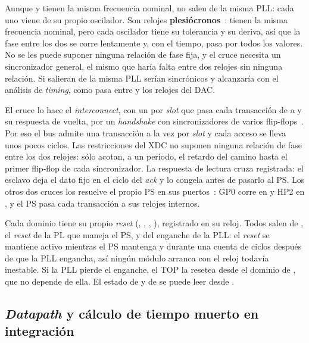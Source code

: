 Aunque  y  tienen la misma frecuencia nominal,
no salen de la misma PLL: cada uno viene de su propio oscilador. Son relojes
\textbf{plesiócronos}~\cite{Dally1998}: tienen la misma frecuencia nominal, pero
cada oscilador tiene su tolerancia y su deriva, así que la fase entre los dos se
corre lentamente y, con el tiempo, pasa por todos los valores. No se les puede
suponer ninguna relación de fase fija, y el cruce necesita un sincronizador
general, el mismo que haría falta entre dos relojes sin ninguna relación. Si
salieran de la misma PLL serían sincrónicos y alcanzaría con el análisis de
\emph{timing}, como pasa entre  y los relojes del DAC.

El cruce lo hace el \emph{interconnect}, con un  por \emph{slot} que pasa
cada transacción de  a  y su respuesta de
vuelta, por un \emph{handshake} con sincronizadores de varios
flip-flops~\cite{Cummings2008}. Por eso el bus admite una transacción a la vez
por \emph{slot} y cada acceso se lleva unos pocos ciclos. Las restricciones del XDC no
suponen ninguna relación de fase entre los dos relojes: sólo acotan, a un
período, el retardo del camino hasta el primer flip-flop de cada sincronizador.
La respuesta de lectura cruza registrada: el esclavo deja el dato fijo en el
ciclo del \emph{ack} y  lo congela antes de pasarlo al PS. Los
otros dos cruces los resuelve el propio PS en sus puertos~\cite{UG585}: GP0
corre en  y HP2 en , y el PS pasa cada
transacción a sus relojes internos.

Cada dominio tiene su propio \emph{reset} (, ,
, ), registrado en su reloj. Todos salen
de , el \emph{reset} de la PL que maneja el PS, y del enganche de la
PLL: el \emph{reset} se mantiene activo mientras el PS mantenga  y
durante una cuenta de ciclos después de que la PLL engancha, así ningún módulo
arranca con el reloj todavía inestable. Si la PLL pierde el enganche, el TOP la
resetea desde el dominio de , que no depende de ella. El estado
de  y de  se puede leer desde
.

\subsection{\emph{Datapath} y cálculo de tiempo muerto en integración}
\label{S:top-datapath}

